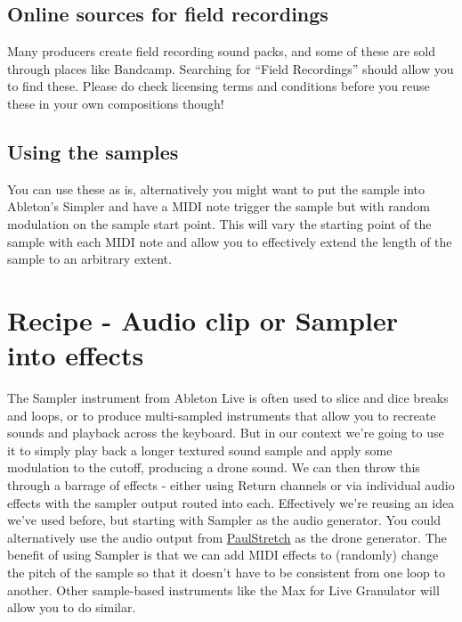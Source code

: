 \documentclass[
  12pt,
  letterpaper,
  oneside,
  open=any]{scrbook}
\begin{document}
\section{Online sources for field
recordings}\label{online-sources-for-field-recordings}

Many producers create field recording sound packs, and some of these are
sold through places like Bandcamp. Searching for ``Field Recordings''
should allow you to find these. Please do check licensing terms and
conditions before you reuse these in your own compositions though!

\section{Using the samples}\label{using-the-samples}

You can use these as is, alternatively you might want to put the sample
into Ableton's Simpler and have a MIDI note trigger the sample but with
random modulation on the sample start point. This will vary the starting
point of the sample with each MIDI note and allow you to effectively
extend the length of the sample to an arbitrary extent.


\chapter{Recipe - Audio clip or Sampler into
effects}\label{020-Recipe-Sampler_drone}

The Sampler instrument from Ableton Live is often used to slice and dice
breaks and loops, or to produce multi-sampled instruments that allow you
to recreate sounds and playback across the keyboard. But in our context
we're going to use it to simply play back a longer textured sound sample
and apply some modulation to the cutoff, producing a drone sound. We can
then throw this through a barrage of effects - either using Return
channels or via individual audio effects with the sampler output routed
into each. Effectively we're reusing an idea we've used before, but
starting with Sampler as the audio generator. You could alternatively
use the audio output from \hyperref[016-Tools-PaulStretch]{PaulStretch}
as the drone generator. The benefit of using Sampler is that we can add
MIDI effects to (randomly) change the pitch of the sample so that it
doesn't have to be consistent from one loop to another. Other
sample-based instruments like the Max for Live Granulator will allow you
to do similar.
\end{document}
